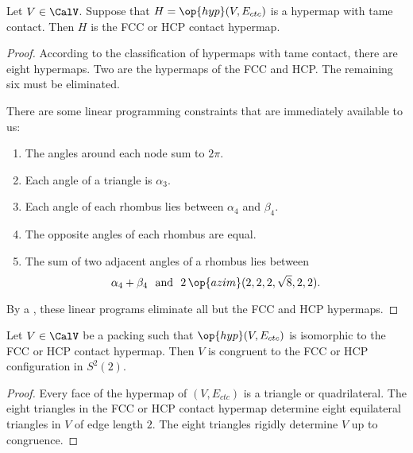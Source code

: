 \begin{lemma}[]\label{lemma:fcc-ft} Let $V\in \CalV$.
  Suppose that $H=\op{hyp}(V,E_{ctc})$ is a hypermap with tame
  contact.  Then $H$ is the FCC or HCP contact hypermap.
\end{lemma}

\begin{proof} According to the classification of hypermaps with tame
  contact, there are eight hypermaps.  Two are the hypermaps of the
  FCC and HCP.  The remaining six must be eliminated.

There are some linear
  programming constraints that are immediately available to us:
\begin{enumerate}\wasitemize 
\item The angles around each node sum to $2\pi$.
\item Each angle of a triangle is $\alpha_3$.
\item Each angle of each rhombus lies between $\alpha_4$ and $\beta_4$.
\item The opposite angles of each rhombus are equal.
\item The sum of two adjacent angles of a rhombus lies between
\[
  \alpha_4 + \beta_4 \text{~~and~~} 2\,\op{azim}(2,2,2,\sqrt8,2,2).
\]
\end{enumerate}\wasitemize 
By a ,
these linear programs eliminate all but the FCC and HCP hypermaps.
\end{proof}



\begin{lemma}[]\label{lemma:kiss-fcc}
  Let $V\in \CalV$ be a packing such that $\op{hyp}(V,E_{ctc})$ is
  isomorphic to the FCC or HCP contact hypermap.  Then $V$ is
  congruent to the FCC or HCP configuration in $S^2(2)$.
\end{lemma}
%
%
%
%
%

\begin{proof} Every face of the hypermap of $(V,E_{ctc})$ is a
  triangle or quadrilateral.  The eight triangles in the FCC or HCP
  contact hypermap determine eight equilateral triangles in $V$ of
  edge length $2$.  The eight triangles rigidly determine $V$ up to
  congruence.
\end{proof}

